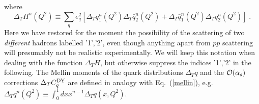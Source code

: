 where 
\begin{equation} \label{hdef}
\Delta_T H^n (Q^2) \equiv \sum_q e_q^2 \left[ \Delta_T q_{1}^n (Q^2) 
\Delta_T \bar{q}_{2}^n (Q^2) + \Delta_T \bar{q}_{1}^n (Q^2)
\Delta_T q_{2}^n (Q^2) \right] \; .
\end{equation}
Here we have restored for the moment the possibility of the scattering of
two {\em different} hadrons labelled '1','2', even though anything apart from
$pp$ scattering will presumably not be realistic experimentally. We will keep
this notation when dealing with the function $\Delta_T H$, but otherwise 
suppress the indices '1','2' in the following. The Mellin moments of the 
quark distributions $\Delta_T q$ and the ${\cal O}(\alpha_s)$ corrections 
$\Delta_T C_q^{{\small {\rm DY}}}$ are defined in analogy with 
Eq.~(\ref{mellin}), e.g. $\Delta_T q^n (Q^2) \equiv \int_0^1 dx x^{n-1} 
\Delta_T q(x,Q^2)$. 
 
